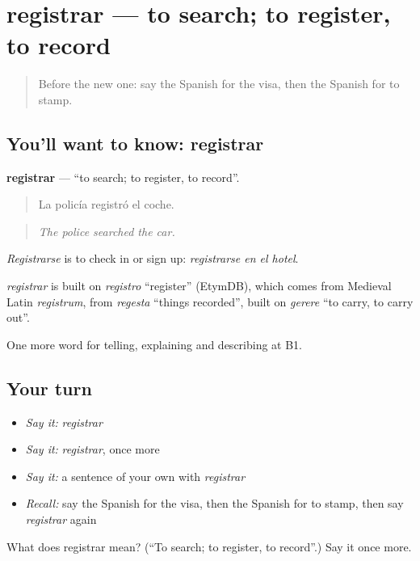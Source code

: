 \section[registrar]{registrar — to search; to register, to record}

\label{lesson:ES-C656-registrar}



\begin{quote}
Before the new one: say the Spanish for the visa, then the Spanish for to stamp.
\end{quote}

\subsection*{You'll want to know: registrar}
\textbf{registrar} — \textquotedblleft{}to search; to register, to record\textquotedblright{}.

\begin{quote}
La policía registró el coche.
\end{quote}

\begin{quote}
\emph{The police searched the car.}
\end{quote}

\emph{Registrarse} is to check in or sign up: \emph{registrarse en el hotel}.

\begin{cousinweb}
\emph{registrar} is built on \emph{registro} \textquotedblleft{}register\textquotedblright{} (EtymDB), which comes from Medieval Latin \emph{registrum}, from \emph{regesta} \textquotedblleft{}things recorded\textquotedblright{}, built on \emph{gerere} \textquotedblleft{}to carry, to carry out\textquotedblright{}.
\end{cousinweb}

\begin{grammarlens}[title={What you've built}]
One more word for telling, explaining and describing at B1.
\end{grammarlens}

\subsection*{Your turn}
\begin{itemize}
\raggedright
  \item \emph{Say it:} \emph{registrar}
  \item \emph{Say it:} \emph{registrar}, once more
  \item \emph{Say it:} a sentence of your own with \emph{registrar}
  \item \emph{Recall:} say the Spanish for the visa, then the Spanish for to stamp, then say \emph{registrar} again
\end{itemize}

\begin{tcolorbox}[breakable,colback=teal!4,colframe=teal!35!black,title={Before you move on}]
What does registrar mean? (\textquotedblleft{}To search; to register, to record\textquotedblright{}.) Say it once more.
\end{tcolorbox}
